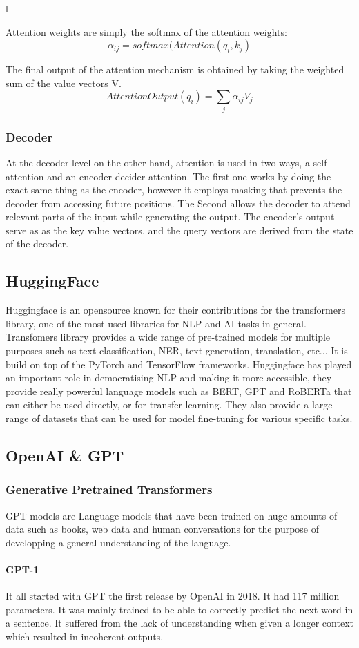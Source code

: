 l\documentclass[a4paper,12pt,twoside]{report}
\begin{document}
Attention weights are simply the softmax of the attention weights: $$\alpha_{ij} = softmax(Attention(q_{i},k_{j})$$

The final output of the attention mechanism is obtained by taking the weighted sum of the value vectors V.
$$AttentionOutput(q_{i}) = \sum_{j}\alpha_{ij} V_{j} $$
\subsubsection{Decoder}
At the decoder level on the other hand, attention is used in two ways, a self-attention and an encoder-decider attention. The first one works by doing the exact same thing as the encoder, however it employs masking that prevents the decoder from accessing future positions. The Second allows the decoder to attend relevant parts of the input while generating the output. The encoder's output serve as as the key value vectors, and the query vectors are derived from the state of the decoder.

\subsection{HuggingFace}
Huggingface\cite{huggingface} is an opensource known for their contributions for the transformers library, one of the most used libraries for NLP and AI tasks in general. 
Transfomers library provides a wide range of pre-trained models for multiple purposes such as text classification, NER, text generation, translation, etc... It is build on top of the PyTorch and TensorFlow frameworks.
Huggingface has played an important role in democratising NLP and making it more accessible, they provide really powerful language models such as BERT, GPT and RoBERTa that can either be used directly, or for transfer learning. They also provide a large range of datasets that can be used for model fine-tuning for various specific tasks.

\subsection{OpenAI \& GPT}
\subsubsection{Generative Pretrained Transformers}
GPT models are Language models that have been trained on huge amounts of data such as books, web data and human conversations for the purpose of developping a general understanding of the language. 
\paragraph{GPT-1}
It all started with GPT the first release by OpenAI\cite{openai} in 2018. It had 117 million parameters. It was mainly trained to be able to correctly predict the next word in a sentence. It suffered from the lack of understanding when given a longer context which resulted in incoherent outputs.
\end{document}
